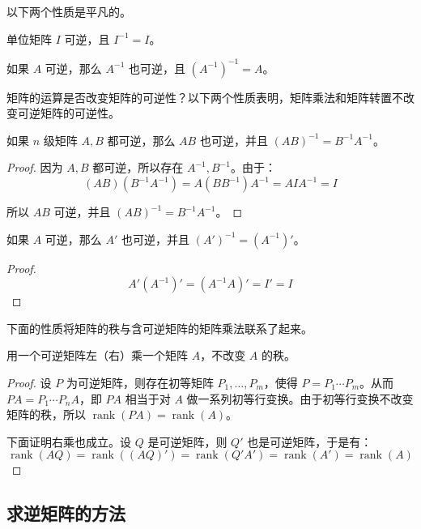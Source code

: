 以下两个性质是平凡的。

\begin{theorem}
	单位矩阵 $I$ 可逆，且 $I^{-1} = I$。
\end{theorem}

\begin{theorem}
	如果 $A$ 可逆，那么 $A^{-1}$ 也可逆，且 $(A^{-1})^{-1} = A$。
\end{theorem}

矩阵的运算是否改变矩阵的可逆性？以下两个性质表明，矩阵乘法和矩阵转置不改变可逆矩阵的可逆性。

\begin{theorem}
	如果 $n$ 级矩阵 $A, B$ 都可逆，那么 $AB$ 也可逆，并且 $(AB)^{-1} = B^{-1} A^{-1}$。
\end{theorem}

\begin{proof}
	因为 $A, B$ 都可逆，所以存在 $A^{-1}, B^{-1}$。由于：
	$$
	(AB)(B^{-1}A^{-1}) = A(BB^{-1})A^{-1} = AIA^{-1} = I
	$$

	所以 $AB$ 可逆，并且 $(AB)^{-1} = B^{-1} A^{-1}$。
\end{proof}

\begin{theorem}
	如果 $A$ 可逆，那么 $A'$ 也可逆，并且 $(A')^{-1} = (A^{-1})'$。
\end{theorem}

\begin{proof}
	$$
	A'(A^{-1})' = (A^{-1} A)' = I' = I
	$$
\end{proof}

下面的性质将矩阵的秩与含可逆矩阵的矩阵乘法联系了起来。

\begin{theorem}
	用一个可逆矩阵左（右）乘一个矩阵 $A$，不改变 $A$ 的秩。
\end{theorem}

\begin{proof}
	设 $P$ 为可逆矩阵，则存在初等矩阵 $P_1, \ldots, P_m$，使得 $P = P_1 \cdots P_m$。从而 $PA = P_1 \cdots P_n A$，即 $PA$ 相当于对 $A$ 做一系列初等行变换。由于初等行变换不改变矩阵的秩，所以 $\operatorname{rank}(PA) = \operatorname{rank}(A)$。

	下面证明右乘也成立。设 $Q$ 是可逆矩阵，则 $Q'$ 也是可逆矩阵，于是有：
	$$
	\operatorname{rank}(AQ) = \operatorname{rank}((AQ)') = \operatorname{rank}(Q'A') = \operatorname{rank}(A') = \operatorname{rank}(A)
	$$
\end{proof}

\subsection{求逆矩阵的方法}

